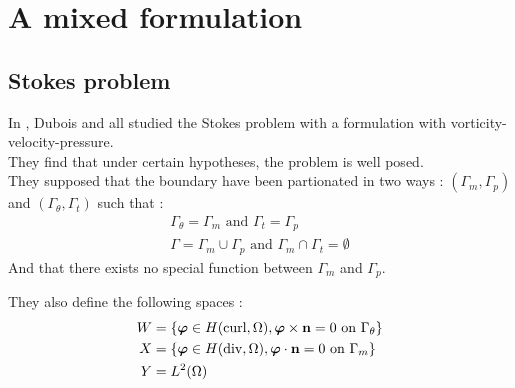 \section{A mixed formulation}
\subsection{Stokes problem}

In \cite{Dubois2003}, Dubois and all studied the Stokes problem with a
formulation with vorticity-velocity-pressure.\\
They find that under certain hypotheses, the problem is well posed.\\

They supposed that the boundary have been partionated in two ways :
$(\Gamma_m,\Gamma_p)$ and $(\Gamma_\theta, \Gamma_t)$ such that :
\begin{gather*}
\Gamma_\theta = \Gamma_m \mbox{ and } \Gamma_t = \Gamma_p\\
\Gamma = \Gamma_m \cup \Gamma_p \mbox{ and } \Gamma_m \cap \Gamma_t = \emptyset
\end{gather*}
And that there exists no special function between $\Gamma_m$ and $\Gamma_p$.

They also define the following spaces :
\begin{align*}
W &= \{\bm{\varphi}\in H(\mathrm{curl},\Omega), \bm{\varphi}\times{\mathbf{n}} = 0
  \mbox{ on } \Gamma_\theta\}\\
X &= \{\bm{\varphi}\in H(\mathrm{div},\Omega), \bm{\varphi}\cdot{\mathbf{n}} = 0
\mbox{ on } \Gamma_m \}\\
Y &= L^2(\Omega)
\end{align*}

